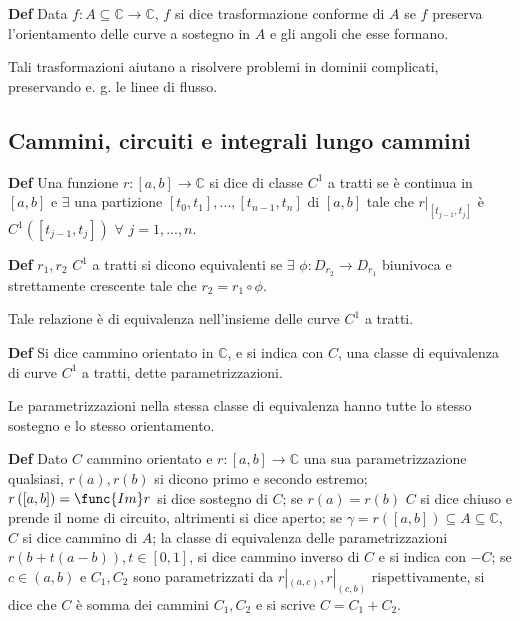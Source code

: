 \documentclass{article}
\begin{document}
\textbf{Def} Data $f:A\subseteq 
\mathbb{C}
\rightarrow 
\mathbb{C}
$, $f$ si dice trasformazione conforme di $A$ se $f$ preserva l'orientamento
delle curve a sostegno in $A$ e gli angoli che esse formano.

Tali trasformazioni aiutano a risolvere problemi in dominii complicati,
preservando e. g. le linee di flusso.

\subsection{Cammini, circuiti e integrali lungo cammini}

\textbf{Def} Una funzione $r:\left[ a,b\right] \rightarrow 
\mathbb{C}
$ si dice di classe $C^{1}$ a tratti se \`{e} continua in $\left[ a,b\right] 
$ e $\exists $ una partizione $\left[ t_{0},t_{1}\right] ,...,\left[
t_{n-1},t_{n}\right] $ di $\left[ a,b\right] $ tale che $r|_{\left[
t_{j-1},t_{j}\right] }$ \`{e} $C^{1}\left( \left[ t_{j-1},t_{j}\right]
\right) $ $\forall $ $j=1,...,n$.

\textbf{Def} $r_{1},r_{2}$ $C^{1}$ a tratti si dicono equivalenti se $%
\exists $ $\phi :D_{r_{2}}\rightarrow D_{r_{1}}$ biunivoca e strettamente
crescente tale che $r_{2}=r_{1}\circ \phi $.

Tale relazione \`{e} di equivalenza nell'insieme delle curve $C^{1}$ a
tratti.

\textbf{Def} Si dice cammino orientato in $%
\mathbb{C}
$, e si indica con $C$, una classe di equivalenza di curve $C^{1}$ a tratti,
dette parametrizzazioni.

Le parametrizzazioni nella stessa classe di equivalenza hanno tutte lo
stesso sostegno e lo stesso orientamento.

\textbf{Def} Dato $C$ cammino orientato e $r:\left[ a,b\right] \rightarrow 
\mathbb{C}
$ una sua parametrizzazione qualsiasi, $r\left( a\right) ,r\left( b\right) $
si dicono primo e secondo estremo; $r\left( \left[ a,b\right] \right) =\func{%
Im}r$ si dice sostegno di $C$; se $r\left( a\right) =r\left( b\right) $ $C$
si dice chiuso e prende il nome di circuito, altrimenti si dice aperto; se $%
\gamma =r\left( \left[ a,b\right] \right) \subseteq A\subseteq 
\mathbb{C}
$, $C$ si dice cammino di $A$; la classe di equivalenza delle
parametrizzazioni $r\left( b+t\left( a-b\right) \right) ,t\in \left[ 0,1%
\right] $, si dice cammino inverso di $C$ e si indica con $-C$; se $c\in
\left( a,b\right) $ e $C_{1},C_{2}$ sono parametrizzati da $r|_{\left(
a,c\right) },r|_{\left( c,b\right) }$ rispettivamente, si dice che $C$ \`{e}
somma dei cammini $C_{1},C_{2}$ e si scrive $C=C_{1}+C_{2}$.
\end{document}
